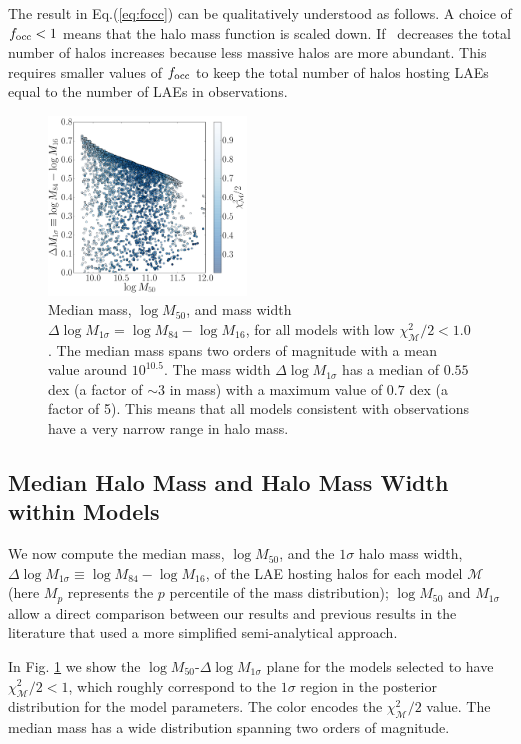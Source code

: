 \documentclass{emulateapj}
\newcommand{\hMsun}{{\ifmmode{h^{-1}{\rm {M_{\odot}}}}\else{$h^{-1}{\rm{M_{\odot}}}$}\fi}}
\newcommand{\mmin}{{\ifmmode{{M_{\rm min}}}\else{${M_{\rm min}}$}\fi}}
\newcommand{\focc}{{\ifmmode{{f_{\rm occ}}}\else{${f_{\rm occ}}$}\fi}}
\begin{document}
The result in Eq.(\ref{eq:focc}) can be qualitatively understood as
follows.   
A choice of $\focc<1$ means that the halo mass function is scaled down.
If \mmin\ decreases the total number of halos increases because less
massive halos are more abundant.
This requires smaller values of $\focc$ to keep the total
number of halos hosting LAEs equal to the number of LAEs in observations.



\begin{figure}
\includegraphics[width=0.47\textwidth]{fig4.pdf}
\caption{Median mass, $\log M_{50}$, and mass width $\Delta \log
  M_{1\sigma}=\log M_{84} - \log M_{16}$, for all models with low
  $\chi^2_{\mathcal{M}}/2 < 1.0$. 
  The median mass spans two orders of magnitude with a mean value
  around $10^{10.5}$\hMsun.   
  The mass width $\Delta \log M_{1\sigma}$ has a median of $0.55$ dex (a factor
  of $\sim3$ in mass) with a maximum value of $0.7$ dex (a factor of
  5). This means that all models consistent with observations have a
  very narrow range in halo mass.}
\label{fig:mmed}
\end{figure}

\subsection{Median Halo Mass and Halo Mass Width within Models}

We now compute the median mass, $\log M_{50}$, and the $1\sigma$ halo mass
width, $\Delta \log M_{1\sigma} \equiv \log M_{84} - \log M_{16}$, of the
LAE hosting halos for each model  $\mathcal{M}$ (here $M_{p}$
represents the $p$ percentile of the mass distribution); $\log M_{50}$
and $M_{1\sigma}$ allow a direct comparison between our results and
previous results in the literature
\citep[e.g.][]{Hayashino2004,Gawiser2007,Ouchi2010,Bielby16} that used
a more simplified semi-analytical approach. 

In Fig. \ref{fig:mmed} we show the $\log M_{50}$-$\Delta \log M_{1\sigma}$
plane for the models selected to have $\chi^{2}_{\mathcal{M}}/2 < 1$,
which roughly correspond to the $1\sigma$ region in the posterior
distribution for the model parameters. The color encodes the
$\chi^{2}_{\mathcal{M}}/2$ value. The median mass has a wide distribution
spanning two orders of magnitude.
\end{document}
